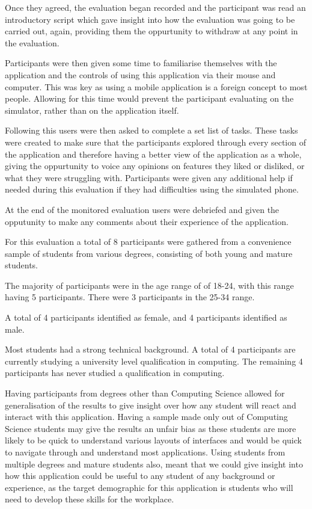 \documentclass{l4proj}
\begin{document}
Once they agreed, the evaluation began recorded and the participant was read an introductory script which gave insight into how
the evaluation was going to be carried out, again, providing them the oppurtunity to withdraw at any point in the evaluation.
\par 
Participants were then given some time to familiarise themselves with the application and the controls of using this application
via their mouse and computer. This was key as using a mobile application is a foreign concept to most people. Allowing for 
this time would prevent the participant evaluating on the simulator, rather than on the application itself. 
\par 
Following this users were then asked to complete a set list of tasks. These tasks were created to make sure that the participants 
explored through every section of the application and therefore having a better view of the application as a whole, giving the oppurtunity
to voice any opinions on features they liked or disliked, or what they were struggling with. Participants were given any additional help 
if needed during this evaluation if they had difficulties using the simulated phone.
\par 
At the end of the monitored evaluation users were debriefed and given the opputunity to make any comments about their experience
of the application.
\par 
\par 
For this evaluation a total of 8 participants were gathered from a convenience sample of students from various degrees, 
consisting of both young and mature students. 
\par 
The majority of participants were in the age range of of 18-24, with this range having 5 participants. There were 
3 participants in the 25-34 range.
\par 
A total of 4 participants identified as female, and 4 participants identified as male.
\par 
Most students had a strong technical background. A total of 4 participants are currently studying a university level 
qualification in computing. The remaining 4 participants has never studied a qualification in computing.
\par 
Having participants from degrees other than Computing Science allowed for generalisation of the results to give insight
over how any student will react and interact with this application. Having a sample made only out of Computing Science
students may give the results an unfair bias as these students are more likely to be quick to understand 
various layouts of interfaces and would be quick to navigate through and understand most applications. Using students from 
multiple degrees and mature students also, meant that we could give insight into how this application could be useful to
any student of any background or experience, as the target demographic for this application is students who will need to develop these
skills for the workplace.
\end{document}
